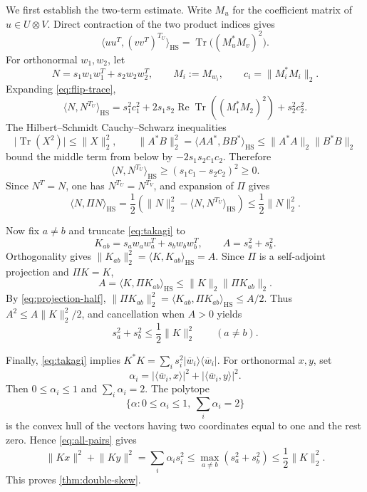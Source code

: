 \documentclass[11pt,reqno]{amsart}
\theoremstyle{remark}
\DeclareMathOperator{\Tr}{Tr}
\newcommand{\ip}[2]{\langle #1,#2\rangle}
\newcommand{\norm}[1]{\lVert #1\rVert}
\newcommand{\abs}[1]{\lvert #1\rvert}
\newcommand{\ketbra}[2]{\lvert #1\rangle\!\langle #2\rvert}
\begin{document}
We first establish the two-term estimate.  Write $M_u$ for the coefficient
matrix of $u\in U\otimes V$.  Direct contraction of the two product indices
gives
\begin{equation}
\label{eq:flip-trace}
  \ip{uu^T}{(vv^T)^{T_U}}_{\mathrm{HS}}
  =\Tr\bigl((M_u^*M_v)^2\bigr).
\end{equation}
For orthonormal $w_1,w_2$, let
\[
  N=s_1w_1w_1^T+s_2w_2w_2^T,\qquad
  M_i:=M_{w_i},\qquad c_i=\norm{M_i^*M_i}_2.
\]
Expanding \cref{eq:flip-trace},
\[
  \ip N{N^{T_U}}_{\mathrm{HS}}
  =s_1^2c_1^2+
    2s_1s_2\operatorname{Re}\Tr((M_1^*M_2)^2)+s_2^2c_2^2.
\]
The Hilbert--Schmidt Cauchy--Schwarz inequalities
\[
  \abs{\Tr(X^2)}\le\norm X_2^2,
  \qquad
  \norm{A^*B}_2^2
  =\ip{AA^*}{BB^*}_{\mathrm{HS}}
  \le\norm{A^*A}_2\norm{B^*B}_2
\]
bound the middle term from below by $-2s_1s_2c_1c_2$.  Therefore
\begin{equation}
\label{eq:partial-transpose-positive}
  \ip N{N^{T_U}}_{\mathrm{HS}}
  \ge(s_1c_1-s_2c_2)^2\ge0.
\end{equation}
Since $N^T=N$, one has $N^{T_U}=N^{T_V}$, and expansion of $\Pi$ gives
\begin{equation}
\label{eq:projection-half}
  \ip N{\Pi N}_{\mathrm{HS}}
  =\frac12\left(\norm N_2^2-
        \ip N{N^{T_U}}_{\mathrm{HS}}\right)
  \le\frac12\norm N_2^2.
\end{equation}

Now fix $a\ne b$ and truncate \cref{eq:takagi} to
\[
  K_{ab}=s_aw_aw_a^T+s_bw_bw_b^T,\qquad
  A=s_a^2+s_b^2.
\]
Orthogonality gives
$\norm{K_{ab}}_2^2=\ip K{K_{ab}}_{\mathrm{HS}}=A$.  Since $\Pi$ is a
self-adjoint projection and $\Pi K=K$,
\[
  A=\ip K{\Pi K_{ab}}_{\mathrm{HS}}
  \le\norm K_2\norm{\Pi K_{ab}}_2.
\]
By \cref{eq:projection-half},
$\norm{\Pi K_{ab}}_2^2
=\ip{K_{ab}}{\Pi K_{ab}}_{\mathrm{HS}}\le A/2$.
Thus $A^2\le A\norm K_2^2/2$, and cancellation when $A>0$ yields
\begin{equation}
\label{eq:all-pairs}
  s_a^2+s_b^2\le\frac12\norm K_2^2
  \qquad(a\ne b).
\end{equation}

Finally, \cref{eq:takagi} implies
$K^*K=\sum_i s_i^2\ketbra{\overline w_i}{\overline w_i}$.
For orthonormal $x,y$, set
\[
  \alpha_i=\abs{\ip{\overline w_i}{x}}^2+
           \abs{\ip{\overline w_i}{y}}^2.
\]
Then $0\le\alpha_i\le1$ and $\sum_i\alpha_i=2$.  The polytope
\[
  \{\alpha:0\le\alpha_i\le1,\ \sum_i\alpha_i=2\}
\]
is the convex hull of the vectors having two coordinates equal to one and
the rest zero.  Hence \cref{eq:all-pairs} gives
\[
  \norm{Kx}^2+\norm{Ky}^2
  =\sum_i\alpha_is_i^2
  \le\max_{a\ne b}(s_a^2+s_b^2)
  \le\frac12\norm K_2^2.
\]
This proves \cref{thm:double-skew}.
\end{document}
